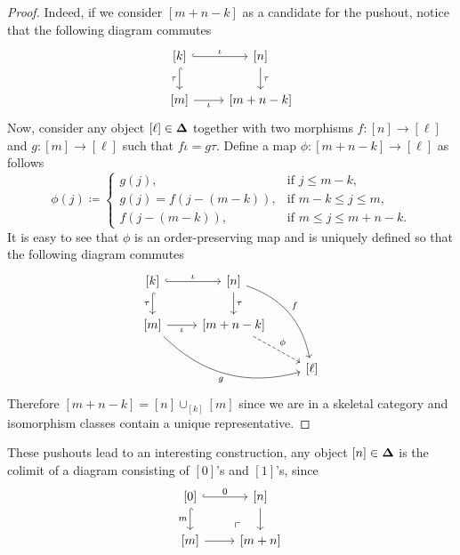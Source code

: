 \begin{proof}
Indeed, if we consider \([m + n - k]\) as a candidate for the pushout, notice
that the following diagram commutes
\[
\begin{tikzcd}
{[k]} \ar[r, hook, "\iota"] \ar[d, hook, "\tau"']
&{[n]} \ar[d, "\tau"] \\
{[m]} \ar[r, "\iota"'] &{[m + n - k]}
\end{tikzcd}
\]
Now, consider any object \([\ell] \in {\mathbf{\Delta}}\) together with two morphisms
\(f: [n] \to [\ell]\) and \(g: [m] \to [\ell]\) such that \(f \iota = g
\tau\). Define a map \(\phi: [m + n - k] \to [\ell]\) as follows
\[
\phi(j) \coloneq
\begin{cases}
  g(j),                  &\text{if } j \leq m - k, \\
  g(j) = f(j - (m - k)), &\text{if } m - k \leq j \leq m, \\
  f(j - (m - k)),        &\text{if } m \leq j \leq m + n - k.
\end{cases}
\]
It is easy to see that \(\phi\) is an order-preserving map and is uniquely
defined so that the following diagram commutes
\[
\begin{tikzcd}
{[k]} \ar[r, hook, "\iota"] \ar[d, hook, "\tau"']
&{[n]} \ar[d, "\tau"] \ar[drd, bend left, "f"] & \\
{[m]} \ar[r, "\iota"'] \ar[rrd, bend right, "g"']
&{[m + n - k]} \ar[rd, dashed, "\phi"] & \\
& &{[\ell]}
\end{tikzcd}
\]
Therefore \([m + n - k] = [n] \cup_{[k]} [m]\) since we are in a skeletal
category and isomorphism classes contain a unique representative.
\end{proof}

These pushouts lead to an interesting construction, any object \([n] \in {\mathbf{\Delta}}\)
is the colimit of a diagram consisting of \([0]\)'s and \([1]\)'s, since
\[
\begin{tikzcd}
{[0]} \ar[r, hook, "0"]
\ar[d, hook, "m"'] \ar[rd, phantom, very near end, "\ulcorner"]
&{[n]} \ar[d] \\
{[m]} \ar[r] &{[m + n]}
\end{tikzcd}
\]

